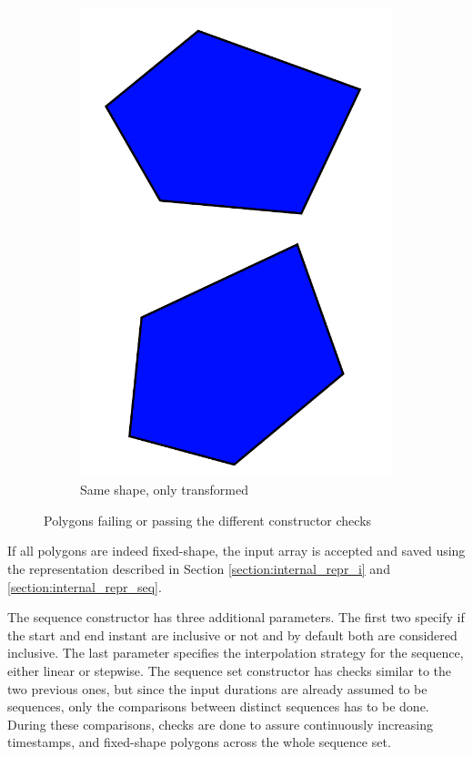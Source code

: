 \begin{figure}[h!]
\begin{subfigure}{.3\textwidth}
        \includegraphics[width=\textwidth]{images/pass_all_tests.pdf}
        \caption{Same shape, only transformed}
    \end{subfigure}
    \caption{Polygons failing or passing the different constructor checks}
    \label{fig:constr_checks}
\end{figure}

If all polygons are indeed fixed-shape, the input array is accepted and saved using the representation described in Section \ref{section:internal_repr_i} and \ref{section:internal_repr_seq}.

The sequence constructor has three additional parameters. The first two specify if the start and end instant are inclusive or not and by default both are considered inclusive. The last parameter specifies the interpolation strategy for the sequence, either linear or stepwise. The sequence set constructor has checks similar to the two previous ones, but since the input durations are already assumed to be sequences, only the comparisons between distinct sequences has to be done. During these comparisons, checks are done to assure continuously increasing timestamps, and fixed-shape polygons across the whole sequence set.

